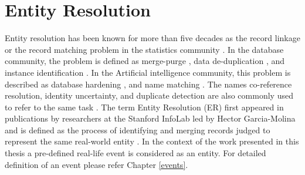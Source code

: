 
\section{Entity Resolution}

Entity resolution has been known for more than five decades as the record linkage or the record matching problem in the statistics community \cite{fellegi1969theory,newcombe1959automatic,herzog2007data}. In the database community, the problem is defined as merge-purge \cite{hernandez1998real}, data de-duplication \cite{sarawagi2002interactive,ananthakrishna2002eliminating}, and instance identification \cite{wang1989inter}. In the Artificial intelligence community, this problem is described as database hardening \cite{cohen2000hardening}, and name matching \cite{bilenko2003adaptive}. The names co-reference resolution, identity uncertainty, and duplicate detection are also commonly used to refer to the same task \cite{elmagarmid2007duplicate}. The term Entity Resolution (ER) first appeared in publications by researchers at the Stanford InfoLab led by Hector Garcia-Molina and is defined as the process of identifying and merging records judged to represent the same real-world entity \cite{garcia2006pair}. In the context of the work presented in this thesis a pre-defined real-life event is considered as an entity. For detailed definition of an event please refer Chapter \ref{events}.

